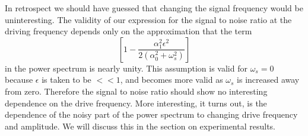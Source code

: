 \documentclass{report}
\begin{document}
In retrospect we should have guessed that changing the signal frequency would be uninteresting. The validity of our expression for the signal to noise ratio at the driving frequency depends only on the approximation that the term
\begin{displaymath}
\left[ 1-\frac{\alpha_1^2\epsilon^2}{2(\alpha_0^2+\omega_s^2)}\right]
\end{displaymath}
in the power spectrum is nearly unity. This assumption is valid for $\omega_s = 0$ because $\epsilon$ is taken to be $<<1$, and becomes more valid as $\omega_s$ is increased away from zero. Therefore the signal to noise ratio should show no interesting dependence on the drive frequency. More interesting, it turns out, is the dependence of the noisy part of the power spectrum to changing drive frequency and amplitude. We will discuss this in the section on experimental results.
\end{document}
